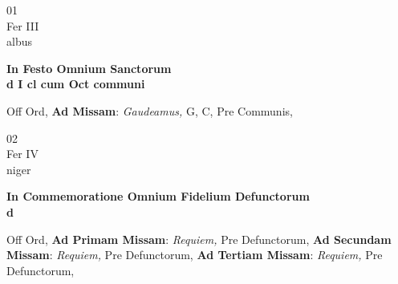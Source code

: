 \documentclass[10pt, openany]{book}
\begin{document}
        \begin{center}
            \begin{minipage}{3.5in}
                \vspace{2em}
                \begin{minipage}{0.5in}
                    {\Huge 01} \\
                    {\normalsize Fer III} \\
                    {\normalsize albus}
                \end{minipage}
                \begin{minipage}{3.0in}
                    \textbf{ \large In Festo Omnium Sanctorum \\
                    \textnormal{\normalsize d I cl cum Oct communi}} \\ 
                \end{minipage}
                \begin{justify}Off Ord, \textbf{Ad Missam}: \textit{Gaudeamus,} G, C, Pre Communis,   
                \end{justify}
            \end{minipage}
        \end{center}
    
        \begin{center}
            \begin{minipage}{3.5in}
                \vspace{2em}
                \begin{minipage}{0.5in}
                    {\Huge 02} \\
                    {\normalsize Fer IV} \\
                    {\normalsize niger}
                \end{minipage}
                \begin{minipage}{3.0in}
                    \textbf{ \large In Commemoratione Omnium Fidelium Defunctorum \\
                    \textnormal{\normalsize d}} \\ 
                \end{minipage}
                \begin{justify}Off Ord, \textbf{Ad Primam Missam}: \textit{Requiem,} Pre Defunctorum,   \textbf{Ad Secundam Missam}: \textit{Requiem,} Pre Defunctorum,   \textbf{Ad Tertiam Missam}: \textit{Requiem,} Pre Defunctorum,   
                \end{justify}
            \end{minipage}
        \end{center}
    
\end{document}
